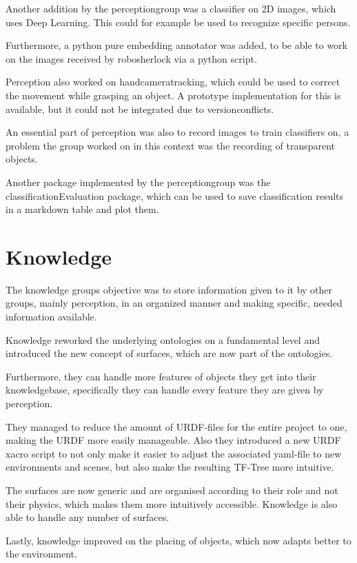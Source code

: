 \documentclass[main.tex]{subfiles}
\begin{document}
		Another addition by the perceptiongroup was a classifier on 2D images, which uses Deep Learning. This could for example be used to recognize specific persons.
		
		Furthermore, a python pure embedding annotator was added, to be able to work on the images received by robosherlock via a python script.
		
		Perception also worked on handcameratracking, which could be used to correct the movement while grasping an object. A prototype implementation for this is available, but it could not be integrated due to versionconflicts. 
		
		An essential part of perception was also to record images to train classifiers on, a problem the group worked on in this context was the recording of transparent objects.
		
		Another package implemented by the perceptiongroup was the classificationEvaluation package, which can be used to save classification results in a markdown table and plot them.
		
		
		
		
		\section{Knowledge}
		The knowledge groups objective was to store information given to it by other groups, mainly perception, in an organized manner and making specific, needed information available.
		
		Knowledge reworked the underlying ontologies on a fundamental level and introduced the new concept of surfaces, which are now part of the ontologies.
		
		Furthermore, they can handle more features of objects they get into their knowledgebase, specifically they can handle every feature they are given by perception.
		
		They managed to reduce the amount of URDF-files for the entire project to one, making the URDF more easily manageable.  Also they introduced a new URDF xacro script to not only make it easier to adjust the associated yaml-file to new environments and scenes, but also make the resulting TF-Tree more intuitive.
		
		The surfaces are now generic and are organised according to their role and not their physics, which makes them more intuitively accessible. Knowledge is also able to handle any number of surfaces.
		
		Lastly, knowledge improved on the placing of objects, which now adapts better to the environment. 		
\end{document}
